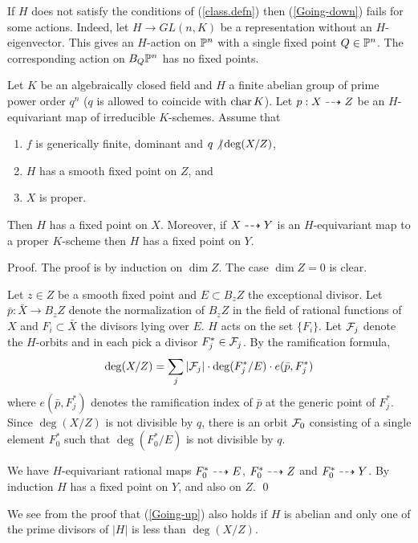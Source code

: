 \begin{rem} If $H$ does not satisfy the  conditions
of (\ref{class.defn})
then (\ref{Going-down}) fails for some actions.
Indeed, let $H\to GL(n,K)$ be a representation without an 
$H$-eigenvector.  This gives an $H$-action on ${\mathbb P}^n$ with a single fixed
point $Q\in {\mathbb P}^n$. The corresponding action on $B_Q{\mathbb P}^n$ has no fixed
points.
\end{rem}

\begin{prop}[Going up]\label{Going-up}
  Let $K$ be an algebraically closed field
and
$H$ a finite abelian group of prime power order $q^n$ 
($q$ is allowed to coincide with $\operatorname{char} K$). Let $p:X\dasharrow Z$ be an
$H$-equivariant map of irreducible
$K$-schemes. Assume that
\begin{enumerate}
\item $f$ is generically finite, dominant and $q\not\vert\deg (X/Z)$,
\item $H$ has a smooth fixed point on $Z$, and
\item $X$ is proper.
\end{enumerate}
\noindent Then $H$ has a fixed point on $X$.
Moreover, if $X\dasharrow Y$ is an $H$-equivariant
map to a proper $K$-scheme then $H$ has a fixed point on $Y$.
\end{prop}

Proof.  The proof is by induction on $\dim Z$. 
The  case  $\dim Z=0$ is clear.

Let $z\in Z$ be a smooth fixed point and $E\subset B_zZ$
the exceptional divisor. Let $\bar p:\bar X\to B_zZ$
denote the normalization of $B_zZ$ in the field of rational
functions of $X$ and $F_i\subset \bar X$ the divisors lying over
$E$.  $H$ acts on the set   $\{F_i\}$. Let ${\cal F}_j$
denote the   $H$-orbits and in each pick a divisor
$F^*_j\in {\cal F}_j$.
By the ramification formula,
$$
\deg (X/Z)=\sum_j 
|{\cal F}_j|\cdot\deg (F^*_j/E)\cdot e(\bar p, F^*_j)
$$
 where
$e(\bar p,F^*_j)$ denotes
the ramification index of $\bar p$ at the generic point of $F^*_j$.
 Since $\deg (X/Z)$ is not divisible by $q$,
there is an orbit ${\cal F}_0$ consisting of  a single element
$F^*_0$  such that $\deg (F^*_0/E)$ is not divisible by $q$.

We have $H$-equivariant rational maps 
$F^*_0\dasharrow E$, $F^*_0\dasharrow Z$ and $F^*_0\dasharrow Y$.
By induction $H$ has a fixed point on $Y$, and also on $Z$.
\qed

\begin{rem} We see from the proof that (\ref{Going-up})
also holds  if $H$ is abelian and only one of the prime divisors of
$|H|$ is less than $\deg (X/Z)$.
\end{rem}


